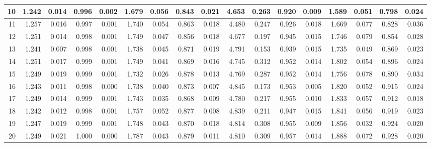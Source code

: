 \documentclass[
]{article}
\begin{document}
\begin{table}[H]
{\begin{tabular}[t]{r|r|r|r|r|r|r|r|r|r|r|r|r|r|r|r|r}
\hline
\hspace{1em}10 & 1.242 & 0.014 & 0.996 & 0.002 & 1.679 & 0.056 & 0.843 & 0.021 & 4.653 & 0.263 & 0.920 & 0.009 & 1.589 & 0.051 & 0.798 & 0.024\\
\hline
\hspace{1em}11 & 1.257 & 0.016 & 0.997 & 0.001 & 1.740 & 0.054 & 0.863 & 0.018 & 4.480 & 0.247 & 0.926 & 0.018 & 1.669 & 0.077 & 0.828 & 0.036\\
\hline
\hspace{1em}12 & 1.251 & 0.014 & 0.998 & 0.001 & 1.749 & 0.047 & 0.856 & 0.018 & 4.677 & 0.197 & 0.945 & 0.015 & 1.746 & 0.079 & 0.854 & 0.028\\
\hline
\hspace{1em}13 & 1.241 & 0.007 & 0.998 & 0.001 & 1.738 & 0.045 & 0.871 & 0.019 & 4.791 & 0.153 & 0.939 & 0.015 & 1.735 & 0.049 & 0.869 & 0.023\\
\hline
\hspace{1em}14 & 1.251 & 0.017 & 0.999 & 0.001 & 1.749 & 0.041 & 0.869 & 0.016 & 4.745 & 0.312 & 0.952 & 0.014 & 1.802 & 0.054 & 0.896 & 0.024\\
\hline
\hspace{1em}15 & 1.249 & 0.019 & 0.999 & 0.001 & 1.732 & 0.026 & 0.878 & 0.013 & 4.769 & 0.287 & 0.952 & 0.014 & 1.756 & 0.078 & 0.890 & 0.034\\
\hline
\hspace{1em}16 & 1.243 & 0.011 & 0.998 & 0.000 & 1.738 & 0.040 & 0.873 & 0.007 & 4.845 & 0.173 & 0.953 & 0.005 & 1.820 & 0.052 & 0.915 & 0.024\\
\hline
\hspace{1em}17 & 1.249 & 0.014 & 0.999 & 0.001 & 1.743 & 0.035 & 0.868 & 0.009 & 4.780 & 0.217 & 0.955 & 0.010 & 1.833 & 0.057 & 0.912 & 0.018\\
\hline
\hspace{1em}18 & 1.242 & 0.012 & 0.998 & 0.001 & 1.757 & 0.052 & 0.877 & 0.008 & 4.839 & 0.211 & 0.947 & 0.015 & 1.841 & 0.056 & 0.919 & 0.023\\
\hline
\hspace{1em}19 & 1.247 & 0.019 & 0.999 & 0.001 & 1.748 & 0.043 & 0.870 & 0.018 & 4.814 & 0.308 & 0.955 & 0.009 & 1.856 & 0.032 & 0.924 & 0.020\\
\hline
\hspace{1em}20 & 1.249 & 0.021 & 1.000 & 0.000 & 1.787 & 0.043 & 0.879 & 0.011 & 4.810 & 0.309 & 0.957 & 0.014 & 1.888 & 0.072 & 0.928 & 0.020\\
\hline
\end{tabular}}
\end{table}
\end{document}
